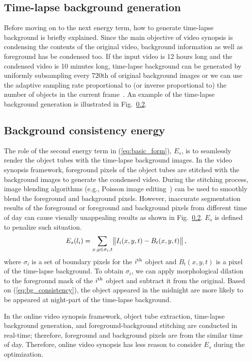 \documentclass[11pt]{hyu_thesis}
\begin{document}
\subsection{Time-lapse background generation}
Before moving on to the next energy term, how to generate time-lapse background is briefly explained. Since the main objective of video synopsis is condensing the contents of the original video, background information as well as foreground has be condensed too. If the input video is 12 hours long and the condensed video is 10 minutes long, time-lapse background can be generated by uniformly subsampling every 720th of original background images or we can use the adaptive sampling rate proportional to (or inverse proportional to) the number of objects in the current frame~\cite{}. An example of the time-lapse background generation is illustrated in Fig.~\ref{}.

\subsection{Background consistency energy}
The role of the second energy term in (\ref{eq:basic_form}), $E_s$, is to seamlessly render the object tubes with the time-lapse background images. In the video synopsis framework, foreground pixels of the object tubes are stitched with the background images to generate the condensed video. During the stitching process, image blending algorithms (e.g., Poisson image editing~\cite{}) can be used to smoothly blend the foreground and background pixels. However, inaccurate segmentation results of the foreground or foreground and background pixels from different time of day can cause visually unappealing results as shown in Fig.~\ref{}. $E_s$ is defined to penalize such situation.
\begin{equation}
\label{eq:bg_consistency}
E_s(l_i)=\sum_{x,y \in \sigma_i,t}\norm{I_i(x,y,t)-B_t(x,y,t)},
\end{equation}
where $\sigma_i$ is a set of boundary pixels for the $i^{\rm{th}}$ object and $B_t(x,y,t)$ is a pixel of the time-lapse background. To obtain $\sigma_i$, we can apply morphological dilation to the foreground mask of the $i^{\rm{th}}$ object and subtract it from the original. Based on (\ref{eq:bg_consistency}), the object appeared in the midnight are more likely to be appeared at night-part of the time-lapse background.

In the online video synopsis framework, object tube extraction, time-lapse background generation, and foreground-background stitching are conducted in real-time; therefore, foreground and background pixels are from the similar time of day. Therefore, online video synopsis has less reason to consider $E_s$ during the optimization.
\end{document}
